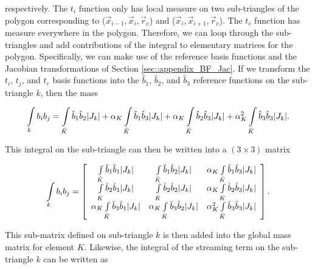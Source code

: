 \noindent respectively. The $t_i$ function only has local measure on two sub-triangles of the polygon corresponding to ($\vec{x}_{i-1}, \vec{x}_i, \vec{r}_c$) and ($\vec{x}_{i}, \vec{x}_{i+1}, \vec{r}_c$). The $t_c$ function has measure everywhere in the polygon. Therefore, we can loop through the sub-triangles and add contributions of the integral to elementary matrices for the polygon. Specifically, we can make use of the reference basis functions and the Jacobian transformations of Section \ref{sec::appendix_BF_Jac}. If we transform the $t_i$, $t_j$, and $t_c$ basis functions into the $\hat{b}_1$, $\hat{b}_2$, and $\hat{b}_3$ reference functions on the sub-triangle $k$, then the mass 

\begin{equation}
\label{eq::App_BF_2D_massterm_trans}
\int\displaylimits_k b_i b_j =\int\displaylimits_{\hat{K}} \hat{b}_1 \hat{b}_2 |J_k| + \alpha_K \int\displaylimits_{\hat{K}} \hat{b}_1 \hat{b}_3 |J_k| + \alpha_K \int\displaylimits_{\hat{K}} \hat{b}_2 \hat{b}_3 |J_k| + \alpha_K^2 \int\displaylimits_{\hat{K}} \hat{b}_3 \hat{b}_3 |J_k| .
\end{equation}

\noindent This integral on the sub-triangle can then be written into a $(3 \times 3)$ matrix

\begin{equation}
\label{eq::App_BF_2D_massterm_littlemat}
\int\displaylimits_k b_i b_j =\left[
\begin{array}{ccc}
\int\limits_{\hat{K}} \hat{b}_1 \hat{b}_1 |J_k| & \int\limits_{\hat{K}} \hat{b}_1 \hat{b}_2 |J_k| & \alpha_K \int\limits_{\hat{K}} \hat{b}_1 \hat{b}_3 |J_k| \\
\int\limits_{\hat{K}} \hat{b}_2 \hat{b}_1 |J_k| & \int\limits_{\hat{K}} \hat{b}_2 \hat{b}_2 |J_k| & \alpha_K \int\limits_{\hat{K}} \hat{b}_2 \hat{b}_3 |J_k|  \\
\alpha_K \int\limits_{\hat{K}} \hat{b}_3 \hat{b}_1 |J_k| &\alpha_K  \int\limits_{\hat{K}} \hat{b}_3\hat{b}_2 |J_k| & \alpha_K^2 \int\limits_{\hat{K}} \hat{b}_3 \hat{b}_3 |J_k| 
\end{array} \right] .
\end{equation}

\noindent This sub-matrix defined on sub-triangle $k$ is then added into the global mass matrix for element $K$. Likewise, the integral of the streaming term on the sub-triangle $k$ can be written as

